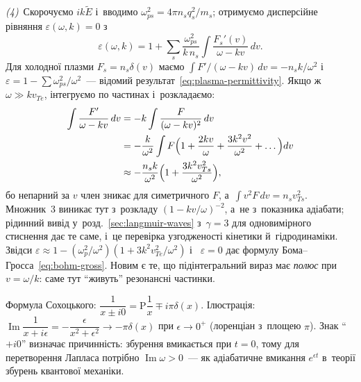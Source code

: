 \emph{(4)}~Скорочуємо $ik\widetilde E$ і~вводимо $\omega_{ps}^2=4\pi n_sq_s^2/m_s$; отримуємо дисперсійне рівняння $\varepsilon(\omega,k)=0$ з~
\begin{equation}\label{eq:eps-kinetic}
	\varepsilon(\omega,k)=1+\sum_s\frac{\omega_{ps}^2}{k\,n_s}\int\frac{F_s'(v)}{\omega-kv}\,dv.
\end{equation}
Для холодної плазми $F_s=n_s\delta(v)$ маємо $\int F'/(\omega-kv)\,dv=-n_sk/\omega^2$ і~
$\varepsilon=1-\sum\omega_{ps}^2/\omega^2$~--- відомий результат~\eqref{eq:plasma-permittivity}.
Якщо ж $\omega\gg kv_{Te}$, інтегруємо по частинах і~розкладаємо:
\begin{align*}
\int\frac{F'}{\omega-kv}\,dv&=-k\int\frac{F}{(\omega-kv)^2}\,dv\\
&=-\frac k{\omega^2}\int F\Bigl(1+\frac{2kv}\omega+\frac{3k^2v^2}{\omega^2}+\dots\Bigr)dv\\
&\approx-\frac{n_sk}{\omega^2}\Bigl(1+\frac{3k^2v_{Ts}^2}{\omega^2}\Bigr),
\end{align*}
бо непарний за $v$ член зникає для симетричного $F$, а~$\int v^2F\,dv=n_sv_{Ts}^2$. Множник~3
виникає тут з~розкладу $(1-kv/\omega)^{-2}$, а~не з~показника адіабати; рідинний вивід у~розд.~\ref{sec:langmuir-waves}
з~$\gamma=3$ для одновимірного стиснення дає те саме, і~це перевірка узгодженості кінетики й~гідродинаміки. Звідси $\varepsilon\approx1-(\omega_p^2/\omega^2)(1+3k^2v_{Te}^2/\omega^2)$ і~
$\varepsilon=0$ дає формулу Бома--Гросса~\eqref{eq:bohm-gross}.
Новим є те, що підінтегральний вираз має \emph{полюс} при $v=\omega/k$: саме тут
\enquote{живуть} резонансні частинки.

\begin{Theory}
Формула Сохоцького: $\dfrac1{x\pm i0}=\mathrm P\dfrac1x\mp i\pi\delta(x)$. Ілюстрація:
$\operatorname{Im}\dfrac1{x+i\epsilon}=-\dfrac{\epsilon}{x^2+\epsilon^2}\to-\pi\delta(x)$ при $\epsilon\to0^+$ (лоренціан з~площею $\pi$).
Знак \enquote{$+i0$} визначає причинність: збурення вмикається при $t=0$, тому для перетворення Лапласа
потрібно $\operatorname{Im}\omega>0$~--- як адіабатичне вмикання $e^{\epsilon t}$ в~теорії збурень квантової механіки.
\end{Theory}

